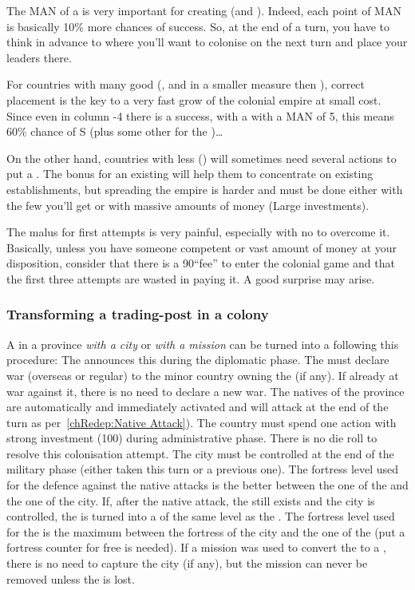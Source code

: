 \begin{playtip}
  The MAN of a \LeaderC is very important for creating \COL (and \TP). Indeed,
  each point of MAN is basically 10\% more chances of success. So, at the end
  of a turn, you have to think in advance to where you'll want to colonise on
  the next turn and place your leaders there.

  For countries with many good \LeaderC (\HIS, \POR and in a smaller measure
  \HOL then \FRA), correct placement is the key to a very fast grow of the
  colonial empire at small cost. Since even in column -4 there is a success,
  with a \LeaderC with a MAN of 5, this means 60\% chance of S (plus some
  other for the \undemi)\ldots

  On the other hand, countries with less \LeaderC (\ANG) will sometimes need
  several actions to put a \COL. The bonus for an existing \COL will help them
  to concentrate on existing establishments, but spreading the empire is
  harder and must be done either with the few \LeaderC you'll get or with
  massive amounts of money (Large investments).

  The malus for first attempts is very painful, especially with no \LeaderC to
  overcome it. Basically, unless you have someone competent or vast amount of
  money at your disposition, consider that there is a 90\ducats ``fee'' to
  enter the colonial game and that the first three attempts are wasted in
  paying it. A good surprise may arise.
\end{playtip}


\subsubsection{Transforming a trading-post in a colony}\label{chExpenses:TP to
  Col}
\aparag A \TP in a province \emph{with a city} or \emph{with a mission} can be
turned into a \COL following this procedure:
\bparag The \MAJ announces this during the diplomatic phase.
\bparag The \MAJ must declare war (overseas or regular) to the \ROTW minor
country owning the \Area (if any). If already at war against it, there is no
need to declare a new war.
\bparag The natives of the province are automatically and immediately
activated and will attack at the end of the turn as per~\ref{chRedep:Native
  Attack}).
\bparag The country must spend one \COL action with strong investment
(100\ducats) during administrative phase. There is no die roll to resolve this
colonisation attempt.
\bparag The city must be controlled at the end of the military phase (either
taken this turn or a previous one). The fortress level used for the defence
against the native attacks is the better between the one of the \TP and the
one of the city.
\bparag If, after the native attack, the \TP still exists and the city is
controlled, the \TP is turned into a \COL of the same level as the \TP. The
fortress level used for the \COL is the maximum between the fortress of the
city and the one of the \TP (put a fortress counter for free is needed).
\bparag If a mission was used to convert the \TP to a \COL, there is no need
to capture the city (if any), but the mission can never be removed unless the
\COL is lost.

